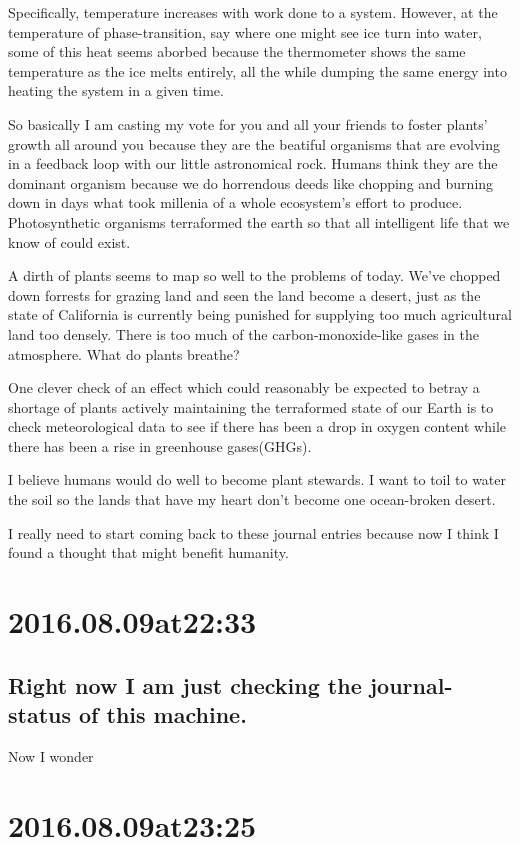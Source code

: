 Specifically, temperature increases with work done to a system. However, at the temperature of phase-transition, say where one might see ice turn into water, some of this heat seems aborbed because the thermometer shows the same temperature as the ice melts entirely, all the while dumping the same energy into heating the system in a given time. 

So basically I am casting my vote for you and all your friends to foster plants' growth all around you because they are the beatiful organisms that are evolving in a feedback loop with our little astronomical rock. Humans think they are the dominant organism because we do horrendous deeds like chopping and burning down in days what took millenia of a whole ecosystem's effort to produce. Photosynthetic organisms terraformed the earth so that all intelligent life that we know of could exist.

A dirth of plants seems to map so well to the problems of today. We've chopped down forrests for grazing land and seen the land become a desert, just as the state of California is currently being punished for supplying too much agricultural land too densely. There is too much of the carbon-monoxide-like gases in the atmosphere. What do plants breathe?

One clever check of an effect which could reasonably be expected to betray a shortage of plants actively maintaining the terraformed state of our Earth is to check meteorological data to see if there has been a drop in oxygen content while there has been a rise in greenhouse gases(GHGs).

I believe humans would do well to become plant stewards. I want to toil to water the soil so the lands that have my heart don't become one ocean-broken desert.

I really need to start coming back to these journal entries because now I think I found a thought that might benefit humanity.

\section*{ 2016.08.09at22:33 }
\subsection*{ Right now I am just checking the journal-status of this machine. }
Now I wonder 

\section*{ 2016.08.09at23:25 }

